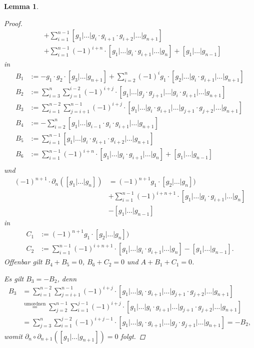 \documentclass[a4paper,twoside,10pt]{scrreprt}
\newtheorem{lemma}[satz]{Lemma}
\theoremstyle{definition}
\begin{document}
\begin{lemma}
\begin{proof}
\begin{align*}
&+\sum\limits_{i=1}^{n-1}[g_1|\ldots|g_i\cdot g_{i+1}\cdot g_{i+2}|\ldots|g_{n+1}]\\
&+\sum\limits_{i=1}^{n-1}(-1)^{i+n}\cdot [g_1|\ldots|g_i\cdot g_{i+1}|\ldots|g_n]+[g_1|\ldots|g_{n-1}]
\end{align*}
in 
\begin{align*}
B_1&:=-g_1\cdot g_2\cdot [g_3|\ldots|g_{n+1}]+\sum\limits_{i=2}^{n}(-1)^i g_1\cdot [g_2|\ldots|g_i\cdot g_{i+1}|\ldots|g_{n+1}]\\
B_2&:=\sum\limits_{i=3}^n\sum\limits_{j=1}^{i-2}(-1)^{i+j}\cdot [g_1|\ldots |g_j\cdot g_{j+1}|\ldots |g_i\cdot g_{i+1}|\ldots |g_{n+1}]\\
B_3&:=\sum\limits_{i=1}^{n-2}\sum\limits_{j=i+1}^{n-1}(-1)^{i+j}\cdot [g_1|\ldots|g_i\cdot g_{i+1}|\ldots|g_{j+1}\cdot g_{j+2}|\ldots|g_{n+1}]\\
B_4&:=-\sum\limits_{i=2}^n [g_1|\ldots|g_{i-1}\cdot g_{i}\cdot g_{i+1}|\ldots|g_{n+1}]\\
B_5&:=\sum\limits_{i=1}^{n-1}[g_1|\ldots|g_i\cdot g_{i+1}\cdot g_{i+2}|\ldots|g_{n+1}]\\
B_6&:=\sum\limits_{i=1}^{n-1}(-1)^{i+n}\cdot [g_1|\ldots|g_i\cdot g_{i+1}|\ldots|g_n]+[g_1|\ldots|g_{n-1}]\\
\end{align*}
und 
\begin{align*}
(-1)^{n+1}\cdot\partial_n([g_1|\ldots|g_n])&=(-1)^{n+1}g_1\cdot[g_2|\ldots|g_n])\\
&+\sum\limits_{i=1}^{n-1}(-1)^{i+n+1}\cdot [g_1|\ldots|g_i\cdot g_{i+1}|\ldots|g_n]\\
&-[g_1|\ldots|g_{n-1}]
\end{align*}
in
\begin{align*}
C_1&:=(-1)^{n+1}g_1\cdot[g_2|\ldots|g_n])\\
C_2&:=\sum\limits_{i=1}^{n-1}(-1)^{i+n+1}\cdot [g_1|\ldots|g_i\cdot g_{i+1}|\ldots|g_n]-[g_1|\ldots|g_{n-1}].
\end{align*}
Offenbar gilt $B_4+B_5=0$, $B_6+C_2=0$ und $A+B_1+C_1=0$.\par
Es gilt $B_3=-B_2$, denn
\begin{align*}
B_3&=\sum\limits_{i=1}^{n-2}\sum\limits_{j=i+1}^{n-1}(-1)^{i+j}\cdot [g_1|\ldots|g_i\cdot g_{i+1}|\ldots|g_{j+1}\cdot g_{j+2}|\ldots|g_{n+1}]\\
&\overset{\text{umordnen}}{=}\sum\limits_{j=2}^{n-1}\sum\limits_{i=1}^{j-1}(-1)^{i+j}\cdot [g_1|\ldots|g_i\cdot g_{i+1}|\ldots|g_{j+1}\cdot g_{j+2}|\ldots|g_{n+1}]\\
&=\sum\limits_{j=3}^n\sum\limits_{i=1}^{j-2}(-1)^{i+j-1}\cdot [g_1|\ldots|g_i\cdot g_{i+1}|\ldots|g_j\cdot g_{j+1}|\ldots|g_{n+1}]=-B_2 ,
\end{align*}
womit $\partial_n\circ \partial_{n+1}([g_1|\ldots|g_{n+1}])=0$ folgt.
\end{proof}
\end{lemma}
\end{document}
